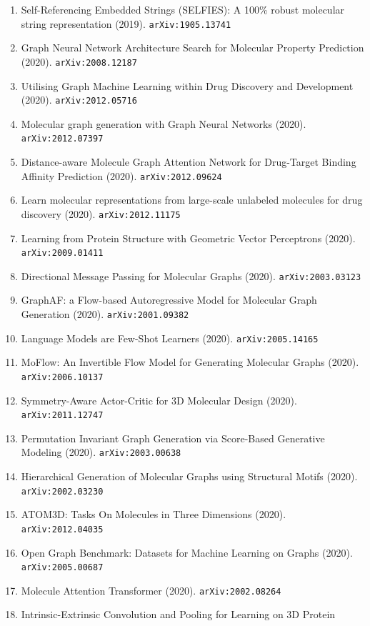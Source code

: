\documentclass[11pt]{article}
\begin{document}
\begin{enumerate}
  Modeling Perspective (2019). \texttt{arXiv:1906.11081}
  \item Self-Referencing Embedded Strings (SELFIES): A 100\% robust molecular
  string representation (2019). \texttt{arXiv:1905.13741}
  \item Graph Neural Network Architecture Search for Molecular Property
  Prediction (2020). \texttt{arXiv:2008.12187}
  \item Utilising Graph Machine Learning within Drug Discovery and Development (2020). \texttt{arXiv:2012.05716}
  \item Molecular graph generation with Graph Neural Networks (2020). \texttt{arXiv:2012.07397}
  \item Distance-aware Molecule Graph Attention Network for Drug-Target Binding
  Affinity Prediction (2020). \texttt{arXiv:2012.09624}
  \item Learn molecular representations from large-scale unlabeled molecules for
  drug discovery (2020). \texttt{arXiv:2012.11175}
  \item Learning from Protein Structure with Geometric Vector Perceptrons (2020). \texttt{arXiv:2009.01411}
  \item Directional Message Passing for Molecular Graphs (2020). \texttt{arXiv:2003.03123}
  \item GraphAF: a Flow-based Autoregressive Model for Molecular Graph
  Generation (2020). \texttt{arXiv:2001.09382}
  \item Language Models are Few-Shot Learners (2020). \texttt{arXiv:2005.14165}
  \item MoFlow: An Invertible Flow Model for Generating Molecular Graphs (2020). \texttt{arXiv:2006.10137}
  \item Symmetry-Aware Actor-Critic for 3D Molecular Design (2020). \texttt{arXiv:2011.12747}
  \item Permutation Invariant Graph Generation via Score-Based Generative
  Modeling (2020). \texttt{arXiv:2003.00638}
  \item Hierarchical Generation of Molecular Graphs using Structural Motifs (2020). \texttt{arXiv:2002.03230}
  \item ATOM3D: Tasks On Molecules in Three Dimensions (2020). \texttt{arXiv:2012.04035}
  \item Open Graph Benchmark: Datasets for Machine Learning on Graphs (2020). \texttt{arXiv:2005.00687}
  \item Molecule Attention Transformer (2020). \texttt{arXiv:2002.08264}
  \item Intrinsic-Extrinsic Convolution and Pooling for Learning on 3D Protein

\end{enumerate}
\end{document}
